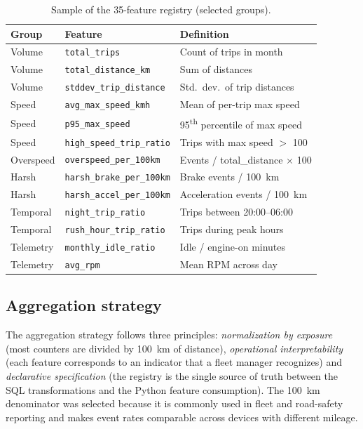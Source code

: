 \begin{table}[h]
\centering
\caption{Sample of the 35-feature registry (selected groups).}
\label{tab:features-sample}
\begin{tabular}{|l|l|l|}
\hline
\textbf{Group} & \textbf{Feature} & \textbf{Definition} \\
\hline
Volume & \texttt{total\_trips} & Count of trips in month \\
Volume & \texttt{total\_distance\_km} & Sum of distances \\
Volume & \texttt{stddev\_trip\_distance} & Std.\ dev.\ of trip distances \\
Speed & \texttt{avg\_max\_speed\_kmh} & Mean of per-trip max speed \\
Speed & \texttt{p95\_max\_speed} & 95\textsuperscript{th} percentile of max speed \\
Speed & \texttt{high\_speed\_trip\_ratio} & Trips with max speed $>$ 100 \\
Overspeed & \texttt{overspeed\_per\_100km} & Events / total\_distance $\times$ 100 \\
Harsh & \texttt{harsh\_brake\_per\_100km} & Brake events / 100~km \\
Harsh & \texttt{harsh\_accel\_per\_100km} & Acceleration events / 100~km \\
Temporal & \texttt{night\_trip\_ratio} & Trips between 20:00--06:00 \\
Temporal & \texttt{rush\_hour\_trip\_ratio} & Trips during peak hours \\
Telemetry & \texttt{monthly\_idle\_ratio} & Idle / engine-on minutes \\
Telemetry & \texttt{avg\_rpm} & Mean RPM across day \\
\hline
\end{tabular}
\end{table}

\subsection{Aggregation strategy}
The aggregation strategy follows three principles: \emph{normalization by exposure} (most counters are divided by 100~km of distance), \emph{operational interpretability} (each feature corresponds to an indicator that a fleet manager recognizes) and \emph{declarative specification} (the registry is the single source of truth between the SQL transformations and the Python feature consumption). The 100~km denominator was selected because it is commonly used in fleet and road-safety reporting and makes event rates comparable across devices with different mileage.

